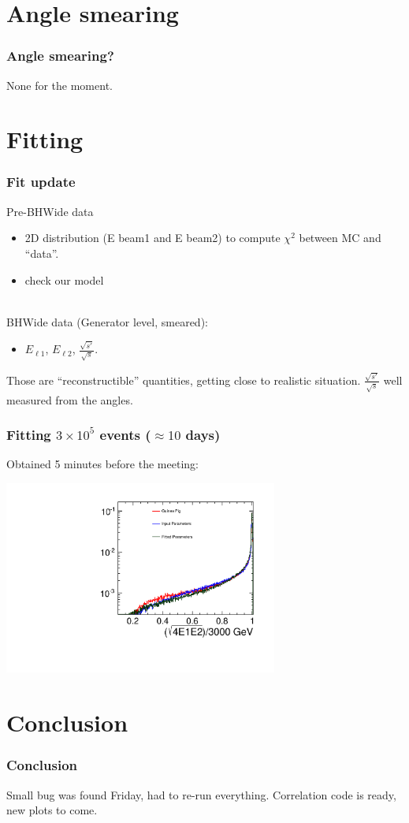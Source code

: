 \documentclass{beamer}
\begin{document}
\section{Angle smearing}
\begin{frame}
\frametitle{Angle smearing?}
None for the moment.
\end{frame}
\section{Fitting}
\begin{frame}
\frametitle{Fit update}
Pre-BHWide data 
\begin{itemize}
  \item 2D distribution (E beam1 and E beam2) to compute $\chi^2$
between MC and ``data''.
\item check our model
\end{itemize}
~\\
BHWide data (Generator level, smeared):
\begin{itemize}
  \item $E_{\ell1}$, $E_{\ell2}$, $\frac{\sqrt{s'}}{\sqrt{s}}$.
\end{itemize}
Those are ``reconstructible'' quantities, getting close to realistic situation.
$\frac{\sqrt{s'}}{\sqrt{s}}$ well measured from the angles.
\end{frame}
\begin{frame}
\frametitle{Fitting $3\times 10^5$ events ($\approx10$ days)}
Obtained 5 minutes before the meeting:
\begin{center}
\includegraphics[width=9cm,page=2]{final_res}
\end{center}
\end{frame}
\section{Conclusion}
\begin{frame}
\frametitle{Conclusion}
Small bug was found Friday, had to re-run everything. Correlation code is ready,
new plots to come.
\end{frame}
\end{document}
